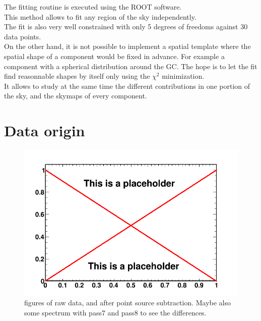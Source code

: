 The fitting routine is executed using the ROOT software. \\

This method allows to fit any region of the sky independently.\\

The fit is also very well constrained with only 5 degrees of freedoms against 30 data points.\\

On the other hand, it is not possible to implement a spatial template where the spatial shape of a component would be fixed in advance. For example a component with a spherical distribution around the GC. The hope is to let the fit find reasonnable shapes by itself only using the $\chi ^2$ minimization.\\

It allows to study at the same time the different contributions in one portion of the sky, and the skymaps of every component.\\


\section{Data origin}

\begin{figure}
 \centering
 \includegraphics[width=.9\linewidth]{pic/dummy.png}
 \caption{figures of raw data, and after point source subtraction. Maybe also some spectrum with pass7 and pass8 to see the differences.}
 \label{fig:method_pass8}
\end{figure}

